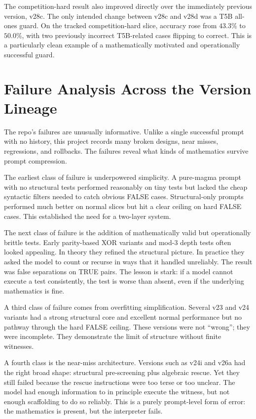 \documentclass[12pt]{amsart}
\begin{document}
The competition-hard result also improved directly over the immediately previous version, v28c. The only intended change between v28c and v28d was a T5B all-ones guard. On the tracked competition-hard slice, accuracy rose from $43.3\%$ to $50.0\%$, with two previously incorrect T5B-related cases flipping to correct. This is a particularly clean example of a mathematically motivated and operationally successful guard.

\section{Failure Analysis Across the Version Lineage}

The repo's failures are unusually informative. Unlike a single successful prompt with no history, this project records many broken designs, near misses, regressions, and rollbacks. The failures reveal what kinds of mathematics survive prompt compression.

The earliest class of failure is underpowered simplicity. A pure-magma prompt with no structural tests performed reasonably on tiny tests but lacked the cheap syntactic filters needed to catch obvious FALSE cases. Structural-only prompts performed much better on normal slices but hit a clear ceiling on hard FALSE cases. This established the need for a two-layer system.

The next class of failure is the addition of mathematically valid but operationally brittle tests. Early parity-based XOR variants and mod-$3$ depth tests often looked appealing. In theory they refined the structural picture. In practice they asked the model to count or recurse in ways that it handled unreliably. The result was false separations on TRUE pairs. The lesson is stark: if a model cannot execute a test consistently, the test is worse than absent, even if the underlying mathematics is fine.

A third class of failure comes from overfitting simplification. Several v23 and v24 variants had a strong structural core and excellent normal performance but no pathway through the hard FALSE ceiling. These versions were not ``wrong''; they were incomplete. They demonstrate the limit of structure without finite witnesses.

A fourth class is the near-miss architecture. Versions such as v24i and v26a had the right broad shape: structural pre-screening plus algebraic rescue. Yet they still failed because the rescue instructions were too terse or too unclear. The model had enough information to in principle execute the witness, but not enough scaffolding to do so reliably. This is a purely prompt-level form of error: the mathematics is present, but the interpreter fails.
\end{document}
